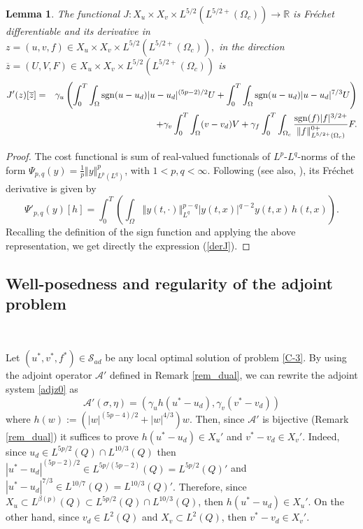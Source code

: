 \documentclass[11pt,reqno]{amsart}%
\newtheorem{lemma}[theorem]{Lemma}
\numberwithin{equation}{section}
\begin{document}
{\begin{lemma}\label{DerJ} The functional $J:{X}_{u}  \times {X}_{v} \times L^{5/2}(L^{5/2+}(\Omega_c))\rightarrow \mathbb{R}$ is Fr\'echet differentiable and
its derivative in $z=(u,v,f)\in {X}_{u}  \times {X}_{v} \times L^{5/2}(L^{5/2+}(\Omega_c)),$ in the direction 
$\overline z=(U,V,F)\in {X}_{u}  \times {X}_{v} \times L^{5/2}(L^{5/2+}(\Omega_c))$ is 
 \begin{eqnarray}\label{derJ}
J'(z)[\overline z]&=&\gamma_u\left(\int_0^T\int_\Omega {\rm sgn}(u-u_d)\vert u-u_d\vert^{(5p-2)/2}U
+\int_0^T\int_\Omega {\rm sgn}(u-u_d)\vert u-u_d\vert^{7/3}U\right)
\nonumber\\
&&+\gamma_v\int_0^T\int_\Omega (v-v_d)V
+\gamma_f\int_0^T\int_{\Omega_c}\frac{{\rm sgn}(f)\vert f\vert^{3/2+}}{\|f\|^{0+}_{L^{5/2+}(\Omega_c)}}F.
\end{eqnarray}
\end{lemma}
\begin{proof}The cost functional is sum of real-valued functionals of $L^p$-$L^q$-norms of the form $\Psi_{p,q}(y)=\frac{1}{p}\Vert y\Vert^p_{L^p(L^q)}$, with $1<p,q<\infty$. Following \cite[Theorem 2.5]{leonard_1974} (see also, \cite[Corollary A.4]{Kunisch}), its Fr\'echet derivative is given by 
$$
\Psi'_{p,q}(y)[h]
=\int_0^T
\left(\int_\Omega \Vert y(t,\cdot)\Vert^{p-q}_{L^q} \vert y(t,x)\vert^{q-2}y(t,x)
\,h(t,x)\right).
$$
Recalling the definition of the sign function and applying the above representation, we get directly the expression (\ref{derJ}).
 \end{proof}

\subsection{Well-posedness and regularity of the adjoint problem}

\

Let $(u^*,v^*,f^*)\in\mathcal{S}_{ad}$ be any local optimal solution of problem \eqref{C-3}. By using the adjoint operator ${\mathcal A}'$ defined in Remark \ref{rem_dual}, we can rewrite the  adjoint system \eqref{adjz0} as 
$$
{\mathcal A}'(\sigma,\eta)=
(\gamma_u h(u^*-u_d),\gamma_v (v^*-v_d))
$$ 
where $h(w):=\left(|w|^{(5p-4)/2}+|w|^{4/3}\right)w$. Then, since ${\mathcal A}'$ is bijective (Remark \ref{rem_dual}) it suffices to prove $h(u^*-u_d)\in X_u'$ and $v^*-v_d\in X_v'$. Indeed,  
since $u_d\in L^{5p/2}(Q)\cap L^{10/3}(Q)$ then $|u^*-u_d|^{(5p-2)/2}\in L^{5p/(5p-2)}(Q)=L^{5p/2}(Q)'$ and $|u^*-u_d|^{7/3}\in L^{10/7}(Q)=L^{10/3}(Q)'$. Therefore, since $X_u\subset L^{\beta(p)}(Q)\subset L^{5p/2}(Q)\cap L^{10/3}(Q)$, then $h(u^*-u_d)\in X_u'$. On the other hand, since $v_d\in L^{2}(Q)$ and $X_v\subset L^2(Q)$,  then 
 $v^*-v_d\in X_v'$.
 
}
\end{document}
